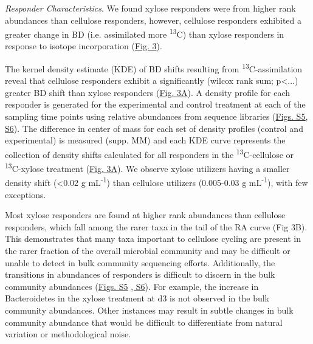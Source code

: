 \textit{Responder Characteristics}.  We found xylose responders were from higher rank abundances than cellulose responders, however, cellulose responders exhibited a greater change in BD (i.e. assimilated more \textsuperscript{13}C) than xylose responders in response to isotope incorporation (\href{https://authorea.com/users/3537/articles/3612/master/file/figures/shift_and_rabund2/shift_and_rabund2.png}{Fig. 3}). 

The kernel density estimate (KDE) of BD shifts resulting from \textsuperscript{13}C-assimilation reveal that cellulose responders exhibit a significantly (wilcox rank sum; p\textless...) greater BD shift than xylose responders (\href{https://authorea.com/users/3537/articles/3612/master/file/figures/shift_and_rabund2/shift_and_rabund2.png}{Fig. 3A}). A density profile for each responder is generated for the experimental and control treatment at each of the sampling time points using relative abundances from sequence libraries (\href{https://authorea.com/users/3537/articles/8459/master/file/figures/xylose_resp_profiles/xylose_resp_profiles.png}{Figs. S5}\href{https://authorea.com/users/3537/articles/8459/master/file/figures/cellulose_resp_profiles/cellulose_resp_profiles.png}{, S6}). The difference in center of mass for each set of density profiles (control and experimental) is measured (supp. MM) and each KDE curve represents the collection of density shifts calculated for all responders in the \textsuperscript{13}C-cellulose or \textsuperscript{13}C-xylose treatment (\href{https://authorea.com/users/3537/articles/3612/master/file/figures/shift_and_rabund2/shift_and_rabund2.png}{Fig. 3A}). We observe xylose utilizers having a smaller density shift (\textless0.02 g mL\textsuperscript{-1}) than cellulose utilizers (0.005-0.03 g mL\textsuperscript{-1}), with few exceptions. 

Most xylose responders are found at higher rank abundances than cellulose responders, which fall among the rarer taxa in the tail of the RA curve (Fig 3B). This demonstrates that many taxa important to cellulose cycling are present in the rarer fraction of the overall microbial community and may be difficult or unable to detect in bulk community sequencing efforts. Additionally, the transitions in abundances of responders is difficult to discern in the bulk community abundances (\href{https://authorea.com/users/3537/articles/8459/master/file/figures/xylose_resp_profiles/xylose_resp_profiles.png}{Figs. S5} \href{https://authorea.com/users/3537/articles/8459/master/file/figures/cellulose_resp_profiles/cellulose_resp_profiles.png}{, S6}). For example, the increase in Bacteroidetes in the xylose treatment at d3 is not observed in the bulk community abundances. Other instances may result in subtle changes in bulk community abundance that would be difficult to differentiate from natural variation or methodological noise.


